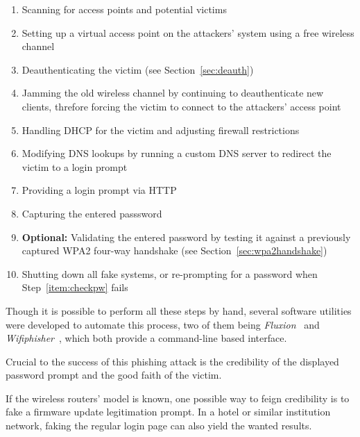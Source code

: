 \begin{enumerate}

\item{Scanning for access points and potential victims}

\item{Setting up a virtual access point on the attackers' system using a free wireless channel}

\item{Deauthenticating the victim (see Section~\ref{sec:deauth})}

\item{Jamming the old wireless channel by continuing to deauthenticate new clients, threfore forcing the victim to connect to the attackers' access point}

\item{Handling DHCP for the victim and adjusting firewall restrictions}

\item{Modifying DNS lookups by running a custom DNS server to redirect the victim to a login prompt}

\item{Providing a login prompt via HTTP}

\item{Capturing the entered passsword}

\item{\textbf{Optional:} Validating the entered password by testing it against a previously captured WPA2 four-way handshake (see Section~\ref{sec:wpa2handshake})}\label{item:checkpw}

\item{Shutting down all fake systems, or re-prompting for a password when Step~\ref{item:checkpw} fails}

\end{enumerate}

Though it is possible to perform all these steps by hand, several software utilities were developed to automate this process, two of them being \emph{Fluxion}~\cite{Fluxion17} and \emph{Wifiphisher}~\cite{Wifiphisher17}, which both provide a command-line based interface.

Crucial to the success of this phishing attack is the credibility of the displayed password prompt and the good faith of the victim. 

If the wireless routers' model is known, one possible way to feign credibility is to fake a firmware update legitimation prompt. In a hotel or similar institution network, faking the regular login page can also yield the wanted results.

